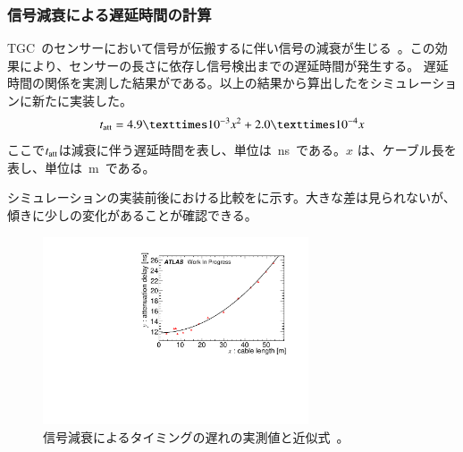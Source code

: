 \subsubsection{信号減衰による遅延時間の計算}
TGC~のセンサーにおいて信号が伝搬するに伴い信号の減衰が生じる~\cite{MT:04}。この効果により、センサーの長さに依存し信号検出までの遅延時間が発生する。
遅延時間の関係を実測した結果がである。以上の結果から算出したをシミュレーションに新たに実装した。
\begin{align}
    t_{\rm{att}} =4.9×10^{-3}x^2+2.0×10^{-4}x
     \label{eq:delay}
\end{align}
ここで$t_{\rm{att}}$は減衰に伴う遅延時間を表し、単位は~ns~である。$x$ は、ケーブル長を表し、単位は~m~である。

シミュレーションの実装前後における比較をに示す。大きな差は見られないが、傾きに少しの変化があることが確認できる。


\begin{figure}[tbp]
    \centering   
    \includegraphics[width=0.7\textwidth,page=1]{img/plot/attk.pdf}
    \caption[信号減衰によるタイミングの遅れの実測値と近似式]{信号減衰によるタイミングの遅れの実測値と近似式~\cite{MT:04}。}
    \label{fig:att0}
\end{figure}


